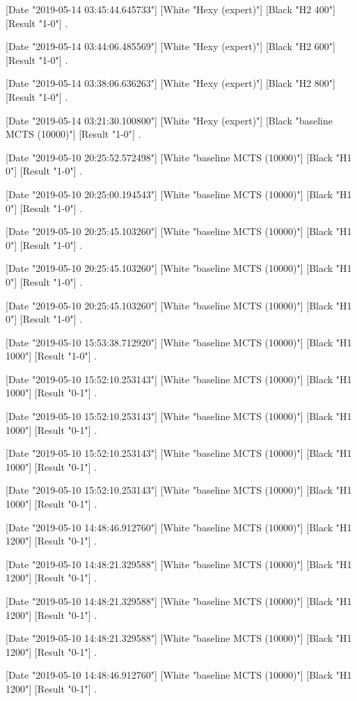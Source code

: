 {[Date "2019-05-14 03:45:44.645733"]
[White "Hexy (expert)"]
[Black "H2 400"]
[Result "1-0"]
.

[Date "2019-05-14 03:44:06.485569"]
[White "Hexy (expert)"]
[Black "H2 600"]
[Result "1-0"]
.

[Date "2019-05-14 03:38:06.636263"]
[White "Hexy (expert)"]
[Black "H2 800"]
[Result "1-0"]
.

[Date "2019-05-14 03:21:30.100800"]
[White "Hexy (expert)"]
[Black "baseline MCTS (10000)"]
[Result "1-0"]
.

[Date "2019-05-10 20:25:52.572498"]
[White "baseline MCTS (10000)"]
[Black "H1 0"]
[Result "1-0"]
.

[Date "2019-05-10 20:25:00.194543"]
[White "baseline MCTS (10000)"]
[Black "H1 0"]
[Result "1-0"]
.

[Date "2019-05-10 20:25:45.103260"]
[White "baseline MCTS (10000)"]
[Black "H1 0"]
[Result "1-0"]
.

[Date "2019-05-10 20:25:45.103260"]
[White "baseline MCTS (10000)"]
[Black "H1 0"]
[Result "1-0"]
.

[Date "2019-05-10 20:25:45.103260"]
[White "baseline MCTS (10000)"]
[Black "H1 0"]
[Result "1-0"]
.

[Date "2019-05-10 15:53:38.712920"]
[White "baseline MCTS (10000)"]
[Black "H1 1000"]
[Result "1-0"]
.

[Date "2019-05-10 15:52:10.253143"]
[White "baseline MCTS (10000)"]
[Black "H1 1000"]
[Result "0-1"]
.

[Date "2019-05-10 15:52:10.253143"]
[White "baseline MCTS (10000)"]
[Black "H1 1000"]
[Result "0-1"]
.

[Date "2019-05-10 15:52:10.253143"]
[White "baseline MCTS (10000)"]
[Black "H1 1000"]
[Result "0-1"]
.

[Date "2019-05-10 15:52:10.253143"]
[White "baseline MCTS (10000)"]
[Black "H1 1000"]
[Result "0-1"]
.

[Date "2019-05-10 14:48:46.912760"]
[White "baseline MCTS (10000)"]
[Black "H1 1200"]
[Result "0-1"]
.

[Date "2019-05-10 14:48:21.329588"]
[White "baseline MCTS (10000)"]
[Black "H1 1200"]
[Result "0-1"]
.

[Date "2019-05-10 14:48:21.329588"]
[White "baseline MCTS (10000)"]
[Black "H1 1200"]
[Result "0-1"]
.

[Date "2019-05-10 14:48:21.329588"]
[White "baseline MCTS (10000)"]
[Black "H1 1200"]
[Result "0-1"]
.

[Date "2019-05-10 14:48:46.912760"]
[White "baseline MCTS (10000)"]
[Black "H1 1200"]
[Result "0-1"]
.

}

